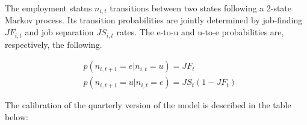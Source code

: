 The employment status $n_{i,t}$ transitions between two states following a 2-state Markov process. Its transition probabilities are jointly determined by job-finding $JF_{i,t}$ and job separation $JS_{i,t}$ rates. The e-to-u and u-to-e probabilities are, respectively, the following. 


\begin{align*}
 & p(n_{i,t+1}=e|n_{i,t}=u) = JF_{t} \\
& p(n_{i,t+1}=u|n_{i,t}=e) = JS_{t} (1  - JF_{t} )
\end{align*}

The calibration of the quarterly version of the model is described in the table below:

\begin{center}\renewcommand{\arraystretch}{1.5}
\begin{table}
\centering
\caption{Household Calibration in Model at Quarterly Frequency}\label{table:Calibration quarterly}
\end{table}
\end{center}
